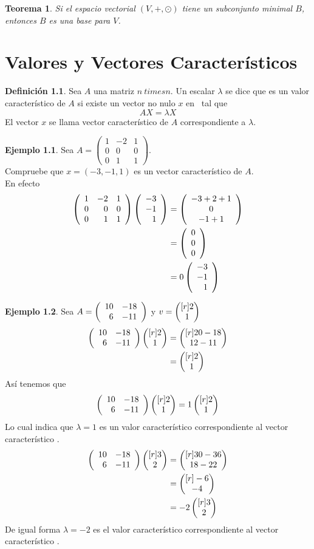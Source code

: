 \documentclass[10pt,a4paper]{report}
\newtheorem{theorem}{Teorema}[chapter]
\theoremstyle{definition}
\newtheorem{dfn}{Definición}[chapter]
\newtheorem{ejemplo}{Ejemplo}[chapter]
\theoremstyle{remark}
\numberwithin{section}{chapter}
\numberwithin{equation}{chapter}
\numberwithin{tacounter}{chapter}
\begin{document}
\begin{theorem}
Si el espacio vectorial $(V , +, \odot)$ tiene un subconjunto minimal $B$, entonces $B$ es una base para $V$.
\end{theorem}


\chapter{Valores y Vectores Característicos}
\begin{dfn}
Sea $A$ una matriz $n \ times n$. Un escalar $\lambda$ se dice que es un valor característico de $A$ si existe un vector no nulo $x$ en \rn \ tal que
$$A X = \lambda X$$
El vector $x$ se llama vector característico de $A$ correspondiente a $\lambda$.
\end{dfn}

\begin{ejemplo}
Sea $A = \left( \begin{array}{rrr}
1 & -2 & 1\\
0 & 0 & 0\\
0 & 1 & 1
\end{array} \right)$.\\
Compruebe que $x= (-3, -1, 1)$ es un vector característico de $A$.\\

\noindent En efecto 
\begin{align*}
\left( \begin{array}{rrr}
1 & -2 &1\\
0 & 0 & 0\\
0&1&1
\end{array} \right)
\left( \begin{array}{r} -3\\ -1\\ 1 \end{array} \right)  &=
\left( \begin{array}{c}
-3+2+1\\
0\\
-1+1
\end{array} \right)\\
&= \left( \begin{array}{r} 0\\ 0\\ 0 \end{array} \right) \\
&= 0 \left( \begin{array}{r} -3\\ -1\\ 1 \end{array} \right) 
\end{align*}
\end{ejemplo}

\begin{ejemplo}
Sea $A = \left( \begin{array}{rr} 10 & -18\\ 6 & -11 \end{array} \right) $ y $v= \begin{pmatrix}[r] 2\\ 1\\ \end{pmatrix} $\\
\begin{align*}
 \left( \begin{array}{rr} 10 & -18\\ 6 & -11 \end{array} \right)  \begin{pmatrix}[r] 2\\ 1\\ \end{pmatrix}  &= \begin{pmatrix}[r] 20-18\\ 12-11\\ \end{pmatrix} \\
&= \begin{pmatrix}[r] 2\\ 1\\ \end{pmatrix} 
\end{align*}
Así tenemos que 
$$ \left( \begin{array}{rr} 10 & -18\\ 6 & -11 \end{array} \right)  \begin{pmatrix}[r] 2\\ 1\\ \end{pmatrix}  = 1 \begin{pmatrix}[r] 2\\ 1\\ \end{pmatrix} $$
Lo cual indica que $\lambda = 1$ es un valor característico correspondiente al vector característico .
\begin{align*}
 \left( \begin{array}{rr} 10 & -18\\ 6 & -11 \end{array} \right)  \begin{pmatrix}[r] 3\\ 2\\ \end{pmatrix}  &= \begin{pmatrix}[r] 30-36\\ 18-22\\ \end{pmatrix} \\
&= \begin{pmatrix}[r] -6\\ -4\\ \end{pmatrix} \\
&= -2 \begin{pmatrix}[r] 3\\ 2\\ \end{pmatrix} 
\end{align*}
De igual forma $\lambda = -2$ es el valor característico correspondiente al vector característico .
\end{ejemplo}
\end{document}
